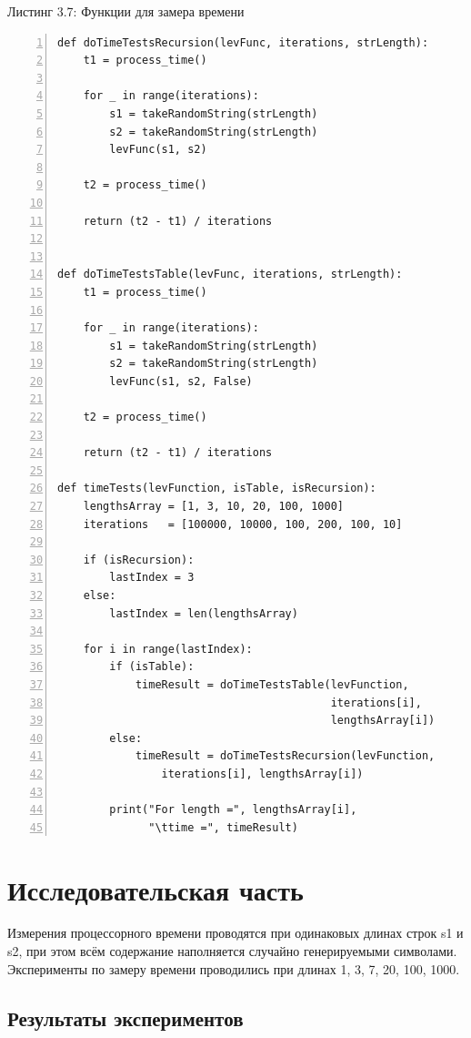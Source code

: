 \documentclass[12pt,a4paper]{report}
\begin{document}
\textrm{Листинг 3.7: Функции для замера времени}
\begin{lstlisting}[frame=single, numbers=left]
def doTimeTestsRecursion(levFunc, iterations, strLength):
    t1 = process_time()

    for _ in range(iterations):
        s1 = takeRandomString(strLength)
        s2 = takeRandomString(strLength)
        levFunc(s1, s2)

    t2 = process_time()

    return (t2 - t1) / iterations


def doTimeTestsTable(levFunc, iterations, strLength):
    t1 = process_time()

    for _ in range(iterations):
        s1 = takeRandomString(strLength)
        s2 = takeRandomString(strLength)
        levFunc(s1, s2, False)

    t2 = process_time()

    return (t2 - t1) / iterations

def timeTests(levFunction, isTable, isRecursion):
    lengthsArray = [1, 3, 10, 20, 100, 1000]
    iterations   = [100000, 10000, 100, 200, 100, 10]

    if (isRecursion):
        lastIndex = 3
    else:
        lastIndex = len(lengthsArray)

    for i in range(lastIndex):
        if (isTable):
            timeResult = doTimeTestsTable(levFunction, 
                                          iterations[i], 
                                          lengthsArray[i])
        else:
            timeResult = doTimeTestsRecursion(levFunction, 
                iterations[i], lengthsArray[i])
        
        print("For length =", lengthsArray[i], 
              "\ttime =", timeResult)
\end{lstlisting}


\newpage
\chapter{Исследовательская часть}

Измерения процессорного времени проводятся при одинаковых длинах строк s1 и s2, при этом всём 
содержание наполняется случайно генерируемыми символами. Эксперименты по замеру времени проводились 
при длинах 1, 3, 7, 20, 100, 1000.

\section{Результаты экспериментов}
\end{document}
